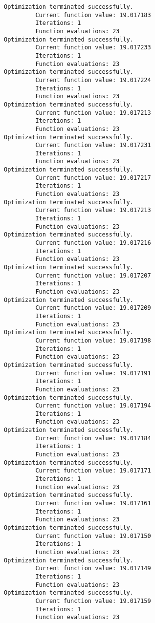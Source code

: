 \documentclass[11pt]{article}
\begin{document}
\begin{Verbatim}[commandchars=\\\{\}]
Optimization terminated successfully.
         Current function value: 19.017183
         Iterations: 1
         Function evaluations: 23
Optimization terminated successfully.
         Current function value: 19.017233
         Iterations: 1
         Function evaluations: 23
Optimization terminated successfully.
         Current function value: 19.017224
         Iterations: 1
         Function evaluations: 23
Optimization terminated successfully.
         Current function value: 19.017213
         Iterations: 1
         Function evaluations: 23
Optimization terminated successfully.
         Current function value: 19.017231
         Iterations: 1
         Function evaluations: 23
Optimization terminated successfully.
         Current function value: 19.017217
         Iterations: 1
         Function evaluations: 23
Optimization terminated successfully.
         Current function value: 19.017213
         Iterations: 1
         Function evaluations: 23
Optimization terminated successfully.
         Current function value: 19.017216
         Iterations: 1
         Function evaluations: 23
Optimization terminated successfully.
         Current function value: 19.017207
         Iterations: 1
         Function evaluations: 23
Optimization terminated successfully.
         Current function value: 19.017209
         Iterations: 1
         Function evaluations: 23
Optimization terminated successfully.
         Current function value: 19.017198
         Iterations: 1
         Function evaluations: 23
Optimization terminated successfully.
         Current function value: 19.017191
         Iterations: 1
         Function evaluations: 23
Optimization terminated successfully.
         Current function value: 19.017194
         Iterations: 1
         Function evaluations: 23
Optimization terminated successfully.
         Current function value: 19.017184
         Iterations: 1
         Function evaluations: 23
Optimization terminated successfully.
         Current function value: 19.017171
         Iterations: 1
         Function evaluations: 23
Optimization terminated successfully.
         Current function value: 19.017161
         Iterations: 1
         Function evaluations: 23
Optimization terminated successfully.
         Current function value: 19.017150
         Iterations: 1
         Function evaluations: 23
Optimization terminated successfully.
         Current function value: 19.017149
         Iterations: 1
         Function evaluations: 23
Optimization terminated successfully.
         Current function value: 19.017159
         Iterations: 1
         Function evaluations: 23

\end{Verbatim}
\end{document}
